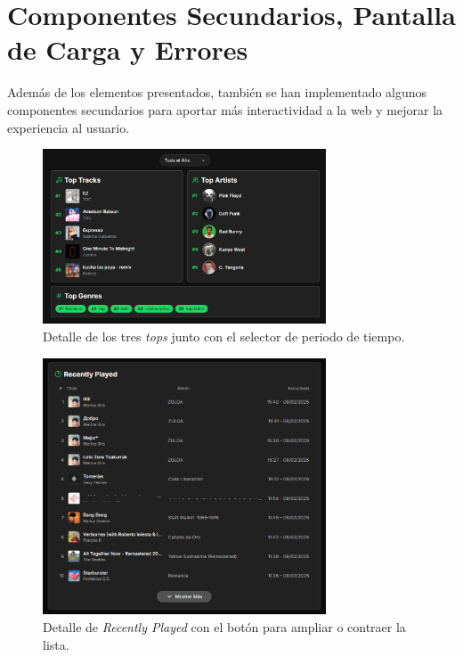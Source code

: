 \section*{Componentes Secundarios, Pantalla de Carga y Errores}

Además de los elementos presentados, también se han implementado algunos componentes secundarios para aportar más interactividad a la web y mejorar la experiencia al usuario.

\begin{figure}[H]
    \centering
    \includegraphics[width=0.75\textwidth]{figures/capturas_ui/tops_detalle.png}
    \caption{Detalle de los tres \textit{tops} junto con el selector de periodo de tiempo.}
    \label{fig:tops_detalle}
\end{figure}

\begin{figure}[H]
    \centering
    \vspace{-10pt}
    \includegraphics[width=0.75\textwidth]{figures/capturas_ui/recently_played.png}
    \caption{Detalle de \textit{Recently Played} con el botón para ampliar o contraer la lista.}
    \label{fig:recently_played}
\end{figure}

